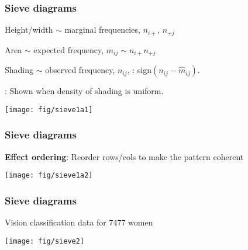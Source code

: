\begin{frame}
  \frametitle{Sieve diagrams}
  \begin{itemize*}
	\item Height/width $\sim$ marginal frequencies, $n_{i+}$,
	 $ n_{+j}$
	\item Area $\sim$ expected frequency, $\hat{m}_{ij} \sim n_{i+}
	  n_{+j}$
	\item Shading $\sim$ observed frequency, $n_{ij}$, : sign$(n_{ij} -
	\hat{m}_{ij})$.
	\item {}: Shown when density of shading is uniform.
  \end{itemize*}
	  \vspace{0.5ex}
	  \begin{center}
	  \texttt{[image: fig/sieve1a1]}
	  \end{center}
\end{frame}

\begin{frame}
  \frametitle{Sieve diagrams}
  \begin{itemize*}
	\item {\large\bfseries Effect ordering}: Reorder rows/cols to make the
	pattern coherent
  \end{itemize*}
	  \vspace{1ex}
	  \begin{center}
	  \texttt{[image: fig/sieve1a2]}
	  \end{center}
\end{frame}

\begin{frame}
  \frametitle{Sieve diagrams}
  \begin{itemize*}
	\item Vision classification data for 7477 women
  \end{itemize*}
	  \vspace{1ex}
	  \begin{center}
	  \texttt{[image: fig/sieve2]}
	  \end{center}
\end{frame}

\begin{comment}
\begin{frame}[fragile]
  \frametitle{Sieve diagrams: SAS Example}
\begin{Input}[fontsize=\small,label=\fbox{\texttt{sieve2.sas}},baselinestretch=0.8]
proc iml;
    \sascomment{*-- frequency table;}
  tab = \{1520   266   124    66,
          234  1512   432    78,
          117   362  1772   205,
           36    82   179   492 \};
    \sascomment{*-- variable and level names;}
  vnames = \{'Right Eye Grade' 'Left Eye Grade'\};
  lnames = \{ 'High' '2' '3' 'Low',
             'High' '2' '3' 'Low'\};
  title  = \{'Unaided distant vision data'\};
    \sascomment{*-- Global options;}
  \sasemph{run sieve(tab, vnames, lnames, title );}
quit;
\end{Input} 
Online weblet: \url{http://datavis.ca/online/sieve/}
\end{frame}
\end{comment}

